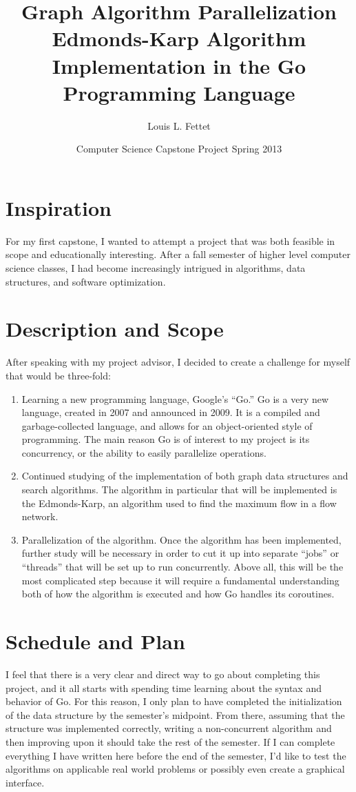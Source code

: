 \documentclass[12pt]{article}
\title{\textbf{Graph Algorithm Parallelization}\\ 
Edmonds-Karp Algorithm Implementation 
in the Go Programming Language}
\date{Computer Science Capstone Project Spring 2013}
\author{Louis L. Fettet}
\begin{document}
\maketitle
\section{Inspiration}
For my first capstone, I wanted to attempt a project that was both feasible in scope and educationally interesting.  After a fall semester of higher level computer science classes, I had become increasingly intrigued in algorithms, data structures, and software optimization. 
\section{Description and Scope}
After speaking with my project advisor, I decided to create a challenge for myself that would be three-fold:
	\begin{enumerate}
		\item Learning a new programming language, Google's “Go.” Go is a very new language, created in 2007 and announced in 2009.  It is a compiled and garbage-collected language, and allows for an object-oriented style of programming.  The main reason Go is of interest to my project is its concurrency, or the ability to easily parallelize operations.
		\item Continued studying of the implementation of both graph data structures and search algorithms.  The algorithm in particular that will be implemented is the Edmonds-Karp, an algorithm used to find the maximum flow in a flow network.
		\item Parallelization of the algorithm.  Once the algorithm has been implemented, further study will be necessary in order to cut it up into separate “jobs” or “threads” that will be set up to run concurrently.  Above all, this will be the most complicated step because it will require a fundamental understanding both of how the algorithm is executed and how Go handles its coroutines.
	\end{enumerate}
\section{Schedule and Plan}
I feel that there is a very clear and direct way to go about completing this project, and it all starts with spending time learning about the syntax and behavior of Go.  For this reason, I only plan to have completed the initialization of the data structure by the semester's midpoint.  From there, assuming that the structure was implemented correctly, writing a non-concurrent algorithm and then improving upon it should take the rest of the semester.  If I can complete everything I have written here before the end of the semester, I’d like to test the algorithms on applicable real world problems or possibly even create a graphical interface.
\end{document}
